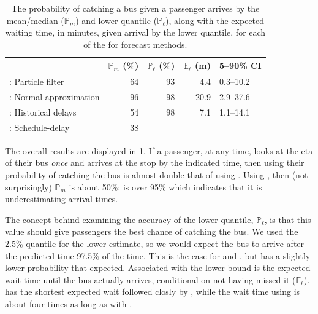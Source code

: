 \begin{knitrout}\small
{}\color{fgcolor}\begin{table}

\caption{\label{tab:model_results_pr_miss}The probability of catching a bus given a passenger arrives by the mean/median ($\mathbb{P}_m$) and lower quantile ($\mathbb{P}_\ell$), along with the expected waiting time, in minutes, given arrival by the lower quantile, for each of the for forecast methods.}
\centering
\fontsize{8}{10}\selectfont
\begin{tabular}[t]{lrrrl}
\toprule
  & $\mathbb{P}_m$ (\%) & $\mathbb{P}_\ell$ (\%) & $\mathbb{E}_\ell$ (m) & 5--90\% CI\\
\midrule
\Fpf{}: Particle filter & 64 & 93 & 4.4 & 0.3--10.2\\
\Fnorm{}: Normal approximation & 96 & 98 & 20.9 & 2.9--37.6\\
\Fhist{}: Historical delays & 54 & 98 & 7.1 & 1.1--14.1\\
\Fsched{}: Schedule-delay & 38 &  &  & \\
\bottomrule
\end{tabular}
\end{table}


\end{knitrout}



The overall results are displayed in \cref{tab:model_results_pr_miss}. If a passenger, at any time, looks at the \gls{eta} of their bus \emph{once} and arrives at the stop by the indicated time, then using \Fpf{} their probability of catching the bus is almost double that of using \Fsched{}. Using \Fhist{}, then (not surprisingly) $\mathbb{P}_m$ is about 50\%; \Fnorm{} is over 95\% which indicates that it is underestimating arrival times.



The concept behind examining the accuracy of the lower quantile, $\mathbb{P}_\ell$, is that this value should give passengers the best chance of catching the bus. We used the 2.5\% quantile for the lower estimate, so we would expect the bus to arrive after the predicted time 97.5\% of the time. This is the case for \Fnorm{} and \Fhist{}, but \Fpf{} has a slightly lower probability that expected. Associated with the lower bound is the expected wait time until the bus actually arrives, conditional on not having missed it ($\mathbb{E}_\ell$). \Fpf{} has the shortest expected wait followed closly by \Fhist{}, while the wait time using \Fnorm{} is about four times as long as with \Fpf{}.



